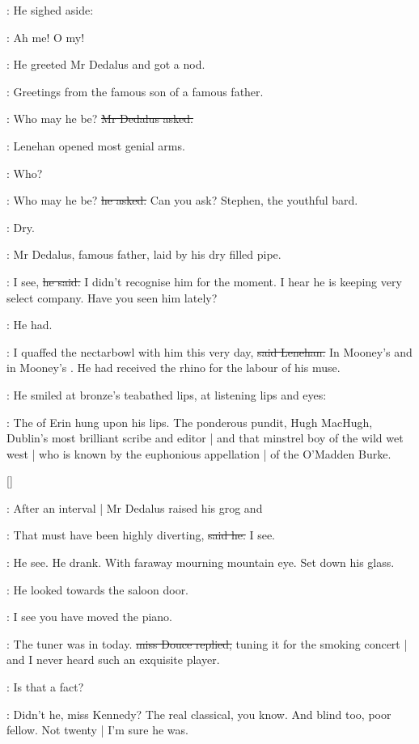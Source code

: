 :
He sighed aside:

\lenehan:
Ah me!
O my!

:
He greeted Mr Dedalus and got a nod.

\lenehan:
Greetings from the famous son of a famous father.

\simon:
Who may he be?
\sout{Mr Dedalus asked.}

:
Lenehan opened most genial arms.

\lenehan:
Who?

\lenehan:
Who may he be?
\sout{he asked.}
Can you ask?
Stephen,
the youthful bard.

:
Dry.

:
Mr Dedalus,
famous father,
laid by his dry filled pipe.

\simon:
I see,
\sout{he said.}
I didn't recognise him for the moment.
I hear he is keeping very select company.
Have you seen him lately?

:
He had.

\lenehan:
I quaffed the nectarbowl with him this very day,
\sout{said Lenehan.}
In Mooney's 
and in Mooney's .
He had received the rhino for the labour of his muse.

:
He smiled at bronze's teabathed lips,
at listening lips and eyes:

\lenehan:
The  of Erin hung upon his lips.
The ponderous pundit,
Hugh MacHugh,
Dublin's most brilliant scribe and editor |
and that minstrel boy of the wild wet west |
who is known by
the euphonious appellation |
of the O'Madden
Burke.

[]

:
After an interval |
Mr Dedalus raised his grog and

\simon:
That must have been highly diverting,
\sout{said he.}
I see.

:
He see.
He drank.
With faraway mourning mountain eye.
Set down his glass.

:
He looked towards the saloon door.

\simon:
I see you have moved the piano.

\MissD:
The tuner was in today.
\sout{miss Douce replied,}
tuning it for the smoking concert |
and I never heard such an exquisite player.

\simon:
Is that a fact?

\MissD:
Didn't he,
miss Kennedy?
The real classical,
you know.
And blind too,
poor fellow.
Not twenty |
I'm sure he was.

